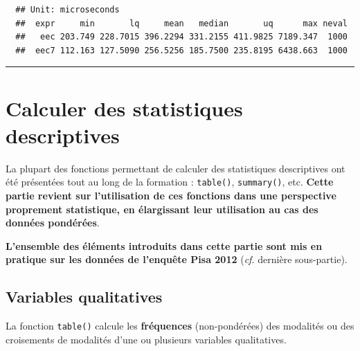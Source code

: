 \documentclass[12pt,twosided, notitlepage]{book}
\begin{document}
\begin{enumerate}
\begin{enumerate}
\begin{verbatim}
  ## Unit: microseconds
  ##  expr     min       lq     mean   median       uq      max neval
  ##   eec 203.749 228.7015 396.2294 331.2155 411.9825 7189.347  1000
  ##  eec7 112.163 127.5090 256.5256 185.7500 235.8195 6438.663  1000
\end{verbatim}

    \begin{center} \rule{0.5\linewidth}{\linethickness}\end{center}

    \bigskip  \fi 
  \end{enumerate}
\end{enumerate}

\section{Calculer des statistiques
descriptives}\label{calculer-des-statistiques-descriptives}

La plupart des fonctions permettant de calculer des statistiques
descriptives ont été présentées tout au long de la formation :
\texttt{table()}, \texttt{summary()}, etc. \textbf{Cette partie revient
sur l'utilisation de ces fonctions dans une perspective proprement
statistique, en élargissant leur utilisation au cas des données
pondérées}.

\textbf{L'ensemble des éléments introduits dans cette partie sont mis en
pratique sur les données de l'enquête Pisa 2012} (\emph{cf.} dernière
sous-partie).

\subsection{Variables qualitatives}\label{variables-qualitatives}

La fonction \texttt{table()} calcule les
\textbf{fréquences} (non-pondérées) des modalités ou des croisements de
modalités d'une ou plusieurs variables qualitatives.
\end{document}
